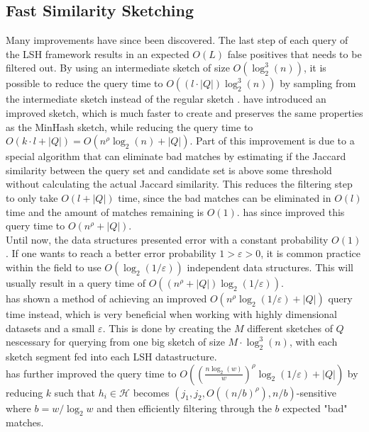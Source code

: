 \subsection{Fast Similarity Sketching}
Many improvements have since been discovered. The last step of each query of the LSH framework results in an expected $O(L)$ false positives that needs to be filtered out. By using an intermediate sketch of size $O(\log_2^3(n))$, it is possible to reduce the query time to $O((l\cdot |Q|)\log_2^3(n))$ by sampling from the intermediate sketch instead of the regular sketch \cite{dahlgaard2017fast}.
\citet{dahlgaard2017fast} have introduced an improved sketch, which is much faster to create and preserves the same properties as the MinHash sketch, while reducing the query time to $O(k\cdot l + |Q|)=O(n^\rho \log_2(n) + |Q|)$. Part of this improvement is due to a special algorithm that can eliminate bad matches by estimating if the Jaccard similarity between the query set and candidate set is above some threshold without calculating the actual Jaccard similarity. This reduces the filtering step to only take $O(l + |Q|)$ time, since the bad matches can be eliminated in $O(l)$ time and the amount of matches remaining is $O(1)$. \citet{christiani2018fast} has since improved this query time to $O(n^\rho + |Q|)$. \\
Until now, the data structures presented error with a constant probability $O(1)$. If one wants to reach a better error probability $1>\varepsilon>0$, it is common practice within the field to use $O(\log_2(1/\varepsilon))$ independent data structures. This will usually result in a query time of $O((n^\rho + |Q|)\log_2(1/\varepsilon))$. \\
\citet{fast-similarity-search} has shown a method of achieving an improved $O(n^\rho \log_2(1/\varepsilon)+|Q|)$ query time instead, which is very beneficial when working with highly dimensional datasets and a small $\varepsilon$. This is done by creating the $M$ different sketches of $Q$ nescessary for querying from one big sketch of size $M\cdot \log^3_2(n)$, with each sketch segment fed into each LSH datastructure.\\
\citet{fast-similarity-search} has further improved the query time to $O((\frac{n\log_2(w)}{w})^{\rho}\log_2(1/\varepsilon)+|Q|)$ by reducing $k$ such that $h_i\in \mathcal{H}$ becomes $(j_1, j_2, O((n/b)^\rho), n/b)$-sensitive where $b=w/\log_2w$ and then efficiently filtering through the $b$ expected "bad" matches. \\
